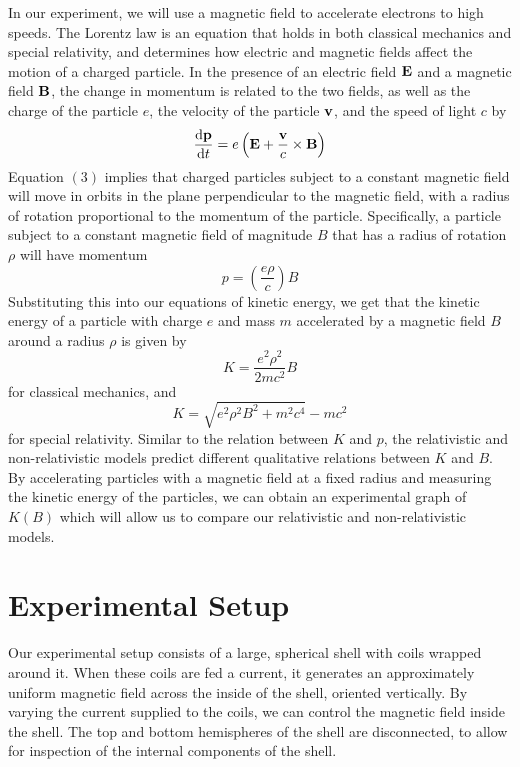 In our experiment, we will use a magnetic field to accelerate electrons to high speeds. The Lorentz law is an equation that holds in both classical mechanics and special relativity, and determines how electric and magnetic fields affect the motion of a charged particle. In the presence of an electric field $\vb{E}$ and a magnetic field $\vb{B}$, the change in momentum is related to the two fields, as well as the charge of the particle $e$, the velocity of the particle $\vb{v}$, and the speed of light $c$ by
\begin{equation}
    \dv{\vb{p}}{t} = e\left(\vb{E} + \frac{\vb{v}}{c} \times \vb{B} \right)
  \end{equation}
  Equation $(3)$ implies that charged particles subject to a constant magnetic field will move in orbits in the plane perpendicular to the magnetic field, with a radius of rotation proportional to the momentum of the particle. Specifically, a particle subject to a constant magnetic field of magnitude $B$ that has a radius of rotation $\rho$ will have momentum 
  \begin{equation}
    p = \left(\frac{e\rho}{c}\right) B
  \end{equation}
Substituting this into our equations of kinetic energy, we get that the kinetic energy of a particle with charge $e$ and mass $m$ accelerated by a magnetic field $B$ around a radius $\rho$ is given by
\begin{equation}
  K = \frac{e^2 \rho^2}{2mc^2} B
\end{equation}
for classical mechanics, and
\begin{equation}
  K = \sqrt{e^2 \rho^2 B^2 + m^2 c^4} - mc^2
\end{equation}
for special relativity. Similar to the relation between $K$ and $p$, the relativistic and non-relativistic models predict different qualitative relations between $K$ and $B$. By accelerating particles with a magnetic field at a fixed radius and measuring the kinetic energy of the particles, we can obtain an experimental graph of $K(B)$ which will allow us to compare our relativistic and non-relativistic models.
\section{Experimental Setup}
Our experimental setup consists of a large, spherical shell with coils wrapped around it. When these coils are fed a current, it generates an approximately uniform magnetic field across the inside of the shell, oriented vertically. By varying the current supplied to the coils, we can control the magnetic field inside the shell. The top and bottom hemispheres of the shell are disconnected, to allow for inspection of the internal components of the shell.

